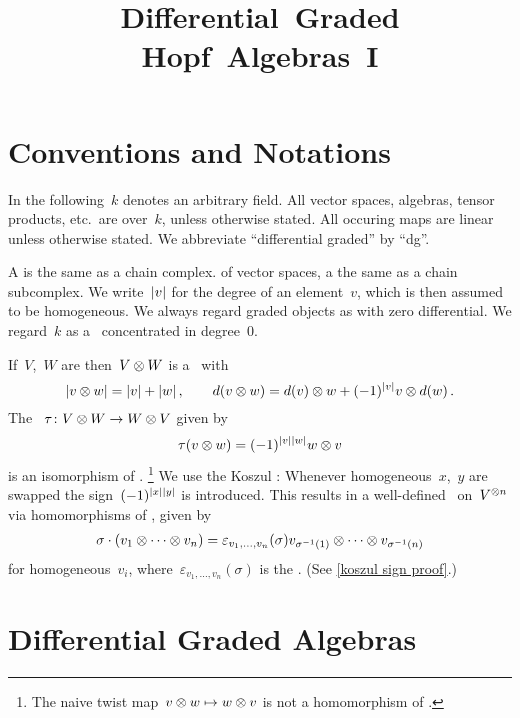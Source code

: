 \documentclass[a4paper,10pt,headings=standardclasses]{scrartcl}
\title{Differential~Graded \\ Hopf~Algebras~I}
\author{}
\date{}
\begin{document}
\maketitle

\vspace{-5em}





\section{Conventions and Notations}
\label{notions and notations}

In the following~$k$ denotes an arbitrary field.
All vector spaces, algebras, tensor products, etc.\ are over~$k$, unless otherwise stated.
All occuring maps are linear unless otherwise stated.
We abbreviate \enquote{differential graded} by \enquote{dg}.

A  is the same as a chain complex.
of vector spaces, a  the same as a chain subcomplex.
We write~$\lvert v\rvert$ for the degree of an element~$v$, which is then assumed to be homogeneous.
We always regard graded objects as {\dgos} with zero differential.
We regard~$k$ as a~{\dgv} concentrated in degree~$0$.

If~$V$,~$W$ are {\dgvs} then~$V \otimes W$ is a {\dgv}~with
\[
  \lvert v \otimes w\rvert
  =
  \lvert v\rvert + \lvert w\rvert \,,
  \qquad
  d(v \otimes w)
  =
  d(v) \otimes w + (-1)^{\lvert v\rvert} v \otimes d(w) \,.
\]
The ~$\tau \colon V \otimes W \to W \otimes V$ given by
\[
  \tau(v \otimes w)
  =
  (-1)^{\lvert v\rvert \lvert w\rvert}
  w \otimes v
\]
is an isomorphism of {\dgvs}.%
\footnote{The naive twist map~$v \otimes w \mapsto w \otimes v$ is not a homomorphism of {\dgvs}.}
We use the Koszul :
Whenever homogeneous~$x$,~$y$ are swapped the sign~$(-1)^{\lvert x\rvert \lvert y\rvert}$ is introduced.
This results in a well-defined~{} on~$V^{\otimes n}$ via homomorphisms of {\dgvs}, given by
\begin{gather*}
  \sigma \cdot (v_1 \otimes \dotsb \otimes v_n)
  =
  \varepsilon_{v_1, \dotsc, v_n}(\sigma)
  v_{\sigma^{-1}(1)} \otimes \dotsb \otimes v_{\sigma^{-1}(n)}
\end{gather*}
for homogeneous~$v_i$, where~$\varepsilon_{v_1, \dotsc, v_n}(\sigma)$ is the .
(See \cref{koszul sign proof}.)





\section{Differential Graded Algebras}
\end{document}
